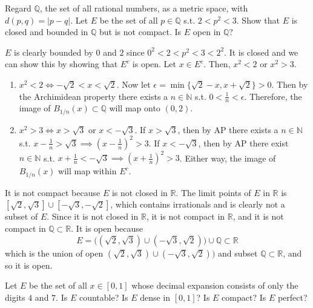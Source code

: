   \begin{exercise}[Rudin 2.16]
    Regard $\mathbb{Q}$, the set of all rational numbers, as a metric space, with $d(p, q) = |p - q|$. Let $E$ be the set of all $p \in \mathbb{Q}$ s.t. $2 < p^2 < 3$. Show that $E$ is closed and bounded in $\mathbb{Q}$ but is not compact. Is $E$ open in $\mathbb{Q}$? 
  \end{exercise}
  \begin{solution}
    $E$ is clearly bounded by $0$ and $2$ since $0^2 < 2 < p^2 < 3 < 2^2$. It is closed and we can show this by showing that $E^c$ is open. Let $x \in E^c$. Then, $x^2< 2$ or $x^2 > 3$. 
    \begin{enumerate}
      \item $x^2 < 2 \iff -\sqrt{2} < x < \sqrt{2}$. Now let $\epsilon = \min\{ \sqrt{2} - x, x + \sqrt{2}\} > 0$. Then by the Archimidean property there exists a $n \in \mathbb{N}$ s.t. $0 < \frac{1}{n} < \epsilon$. Therefore, the image of $B_{1/n} (x) \subset \mathbb{Q}$ will map onto $(0, 2)$. 

      \item $x^2 > 3 \iff x > \sqrt{3}$ or $x < - \sqrt{3}$. If $x > \sqrt{3}$, then by AP there exists a $n \in \mathbb{N}$ s.t. $x - \frac{1}{n} > \sqrt{3} \implies (x - \frac{1}{n})^2 > 3$. If $x < - \sqrt{3}$, then by AP there exist $n \in \mathbb{N}$ s.t. $x + \frac{1}{n} < -\sqrt{3} \implies (x + \frac{1}{n})^2 > 3$. Either way, the image of $B_{1/n} (x)$ will map within $E^c$. 
    \end{enumerate}
    It is not compact because $E$ is not closed in $\mathbb{R}$. The limit points of $E$ in $\mathbb{R}$ is $[\sqrt{2}, \sqrt{3}] \cup [-\sqrt{3}, -\sqrt{2}]$, which contains irrationals and is clearly not a subset of $E$. Since it is not closed in $\mathbb{R}$, it is not compact in $\mathbb{R}$, and it is not compact in $\mathbb{Q} \subset \mathbb{R}$. It is open because 
    \begin{equation}
      E = \big( (\sqrt{2}, \sqrt{3}) \cup (-\sqrt{3}, \sqrt{2})\big) \cup \mathbb{Q} \subset \mathbb{R}
    \end{equation}
    which is the union of open $(\sqrt{2}, \sqrt{3}) \cup (-\sqrt{3}, \sqrt{2})\big)$ and subset $\mathbb{Q} \subset \mathbb{R}$, and so it is open. 
  \end{solution}

  \begin{exercise}[Rudin 2.17]
    Let $E$ be the set of all $x \in [0, 1]$ whose decimal expansion consists of only the digits $4$ and $7$. Is $E$ countable? Is $E$ dense in $[0, 1]$? Is $E$ compact? Is $E$ perfect? 
  \end{exercise}
  \begin{solution}
    
  \end{solution}

